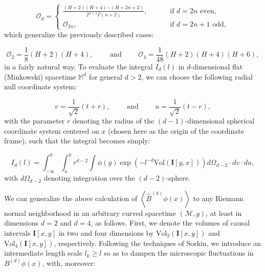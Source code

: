 \documentclass{article}
\begin{document}
\begin{equation}
\mathcal{O}_d = \begin{cases}
\frac{\left( H + 2 \right) \left( H + 4 \right) \cdots \left( H + 2n + 2 \right)}{2^{n + 1} \Gamma \left( n + 2 \right)}, \qquad & \text{ if } d = 2n \text{ even},\\
\mathcal{O}_{2 n}, \qquad & \text{ if } d = 2n + 1 \text{ odd},
\end{cases}
\end{equation}
which generalize the previously described cases:

\begin{equation}
\mathcal{O}_2 = \frac{1}{8} \left( H + 2 \right) \left( H + 4 \right), \qquad \text{ and } \qquad \mathcal{O}_4 = \frac{1}{48} \left( H + 2 \right) \left( H + 4 \right) \left( H + 6 \right),
\end{equation}
in a fairly natural way. To evaluate the integral ${I_d \left( l \right)}$ in $d$-dimensional flat (Minkowski) spacetime ${\mathbb{M}^d}$ for general ${d > 2}$, we can choose the following radial null coordinate system:

\begin{equation}
v = \frac{1}{\sqrt{2}} \left( t + r \right), \qquad \text{ and } \qquad u = \frac{1}{\sqrt{2}} \left( t - r \right),
\end{equation}
with the parameter $r$ denoting the radius of the ${\left( d - 1 \right)}$-dimensional spherical coordinate system centered on $x$ (chosen here as the origin of the coordinate frame), such that the integral becomes simply:

\begin{equation}
I_d \left( l \right) = \int_{- \infty}^{0} \int_{u}^{0} r^{d - 2} \int \phi \left( y \right) \exp \left( - l^{-d} \mathrm{Vol} \left( \mathbf{I} \left[ y, x \right] \right) \right) d \Omega_{d - 2} \cdot d v \cdot d u,
\end{equation}
with ${d \Omega_{d - 2}}$ denoting integration over the ${\left( d - 2 \right)}$-sphere.

We can generalize the above calculation of ${\left\langle \hat{B}^{\left( d \right)} \phi \left( x \right) \right\rangle}$ to any Riemann normal neighborhood in an arbitrary curved spacetime ${\left( \mathcal{M}, g \right)}$, at least in dimensions ${d = 2}$ and ${d = 4}$, as follows. First, we denote the volumes of causal intervals ${\mathbf{I} \left[ x, y \right]}$ in two and four dimensions by ${\mathrm{Vol}_2 \left( \mathbf{I} \left[ x, y \right] \right)}$ and ${\mathrm{Vol}_4 \left( \mathbf{I} \left[ x, y \right] \right)}$, respectively. Following the techniques of Sorkin\cite{sorkin3}, we introduce an intermediate length scale ${l_k \geq l}$ so as to dampen the microscopic fluctuations in ${B^{\left( d \right)} \phi \left( x \right)}$, with, moreover:
\end{document}

